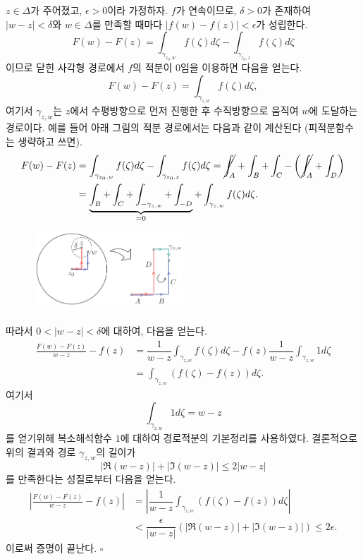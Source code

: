 $z\in \Delta$가 주어졌고, $\epsilon>0$이라 가정하자.
$f$가 연속이므로, $\delta>0$가 존재하여
$|w-z|<\delta$와 $w\in \Delta$를 만족할 때마다
$|f(w) - f(z)| <\epsilon$가 성립한다.
\[
F(w) - F(z) = \int_{\gamma_{z_0,w}} f(\zeta) d\zeta
- \int_{\gamma_{z_0,z}} f(\zeta) d\zeta
\]
이므로
닫힌 사각형 경로에서 $f$의 적분이 $0$임을 이용하면 다음을 얻는다.
\[
F(w) - F(z) = \int_{\gamma_{z,w}} f(\zeta) d\zeta,
\]
여기서 $\gamma_{z,w}$는 $z$에서 수평방향으로 먼저 진행한 후
수직방향으로 움직여 $w$에 도달하는 경로이다.
예를 들어 아래 그림의 적분 경로에서는 다음과 같이 계산된다 (피적분함수는 생략하고 쓰면).
\begin{align*}
F(w) - F(z) 
&= \int_{\gamma_{z_0,w}} f(\zeta) d\zeta
- \int_{\gamma_{z_0,z}} f(\zeta) d\zeta
= \cancel{\int_A} + \int_B + \int_C - \left(\cancel{\int_A} + \int_D \right) \\
&= \underbrace{\int_B + \int_C + \int_{-\gamma_{z,w}} + \int_{-D}}_{=0}
+\int_{\gamma_{z,w}} f(\zeta) d\zeta.
\end{align*}

\begin{figure}[h!]
\begin{center}
\includegraphics[width=0.5\textwidth]{./SaltChapter/fig-3-0-13}
\end{center}
\end{figure}

따라서 $0<|w-z|<\delta$에 대하여, 다음을 얻는다.
\begin{align*}
\frac{F(w)-F(z)}{w-z} - f(z)
&= \dfrac1{w-z}\int_{\gamma_{z,w}} f(\zeta)d\zeta - f(z) \dfrac1{w-z}\int_{\gamma_{z,w}} 1 d\zeta \\ 
& = \int_{\gamma_{z,w}} (f(\zeta) - f(z)) d\zeta.
\end{align*}
여기서 
\[
\int_{\gamma_{z,w}} 1 d\zeta = w-z
\]
를 얻기위해 복소해석함수 $1$에 대하여 경로적분의 기본정리를 사용하였다.
결론적으로 위의 결과와 경로 $\gamma_{z,w}$의 길이가
\[
|\Re(w-z)| + |\Im(w-z)| \le 2|w-z|
\]
를 만족한다는 성질로부터 다음을 얻는다.
\begin{align*}
\left| \frac{F(w)-F(z)}{w-z} - f(z) \right|
&= \left| \dfrac1{w-z} \int_{\gamma_{z,w}} (f(\zeta) - f(z)) d\zeta \right|  \\
&< \dfrac\epsilon{|w-z|} (|\Re(w-z)| + |\Im(w-z)|) \le 2\epsilon.
\end{align*}
이로써 증명이 끝난다.
\hfill $\square$

